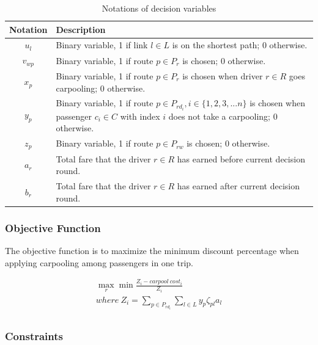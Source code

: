 \begin{table}[ht]
  \centering
  \caption{Notations of decision variables}
  \begin{tabularx}{\textwidth}{cX}
  \toprule
  Notation & Description \\
  \midrule
    $u_l$ & Binary variable, 1 if link $l \in L$ is on the shortest path; 0 otherwise. \\
    $v_{wp}$ & Binary variable, 1 if route $p \in P_r$ is chosen; 0 otherwise. \\
    $x_p$ & Binary variable, 1 if route $p \in P_r$ is chosen when driver $r \in R$ goes carpooling; 0 otherwise. \\
    $y_p$ & Binary variable, 1 if route $p \in P_{rd_i}, i \in \{1,2,3,...n\}$ is chosen when passenger $c_i \in C$ with index $i$ does not take a carpooling; 0 otherwise. \\
    $z_p$ & Binary variable, 1 if route $p \in P_{rw}$ is chosen; 0 otherwise. \\
    $a_r$ & Total fare that the driver $r \in R$ has earned before current decision round. \\
    $b_r$ & Total fare that the driver $r \in R$ has earned after current decision round. \\
  \bottomrule
  \end{tabularx}
\end{table}  
\newpage

\subsubsection*{Objective Function}

The objective function is to maximize the minimum discount percentage when applying carpooling among passengers in one trip.

\begin{align*}
  \max_{r} \min \frac{Z_i - carpool\ cost_i}{Z_i} \tag{IP1} \\
  where\ Z_i = \sum_{p \in P_{rd_i}} \sum_{l \in L} y_p \zeta_{pl} a_l \\
\end{align*}

\subsubsection*{Constraints}

